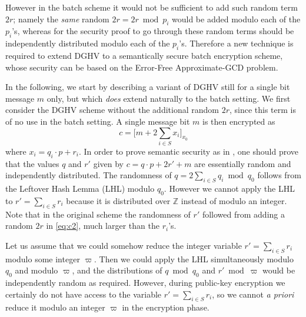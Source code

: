 \documentclass{llncs}
\begin{document}
However in the batch scheme it would not be sufficient to add such
random term $2r$; namely the \emph{same} random
 $2r=2r \bmod p_i$ would be added 
modulo each of the $p_i$'s, whereas for the security proof to go through
these random terms should be independently distributed modulo each of the
$p_i$'s. Therefore a new technique is required to extend DGHV to
a semantically secure batch encryption scheme, whose security can be based
on the Error-Free Approximate-GCD problem. 

In the following, we start by describing a variant of DGHV still for a
single bit message $m$ only, but which \emph{does} extend naturally to the
batch setting. We first consider the DGHV scheme without the additional
random $2r$, since this term is of no use in the batch setting. A single
message bit $m$ is then encrypted as
\[
    c = \Big[m + 2\sum\limits_{i\in S} x_i\Big]_{x_0}
\]
where $x_i=q_i \cdot p+r_i$. In order to prove semantic security as in
\cite{vDGHV2010}, one should prove that the values $q$ and $r'$ given by
$c=q \cdot p+2r'+m$ are essentially random and independently distributed.
The randomness of $q=2\sum_{i \in S} q_i \bmod q_0$ follows from the
Leftover Hash Lemma (LHL) modulo $q_0$. However we cannot apply the LHL
to $r'=\sum_{i \in S} r_i$ because it is distributed over ${\mathbb Z}$
instead of modulo an integer. Note that in the original scheme the
randomness of $r'$ followed from adding a random $2r$ in \eqref{eq:c2},
much larger than the $r_i$'s.

Let us assume that we could somehow reduce the integer variable
$r'=\sum_{i \in S} r_i$ modulo some integer $\varpi$. Then we could apply
the LHL simultaneously modulo $q_0$ and modulo $\varpi$, and the
distributions of $q \bmod q_0$ and $r' \bmod \varpi$ would be
independently random as required. However, during public-key encryption
we certainly do not have access to the variable $r'=\sum_{i \in S} r_i$,
so we cannot \emph{a priori} reduce it modulo an integer $\varpi$ in the
encryption phase.
\end{document}
